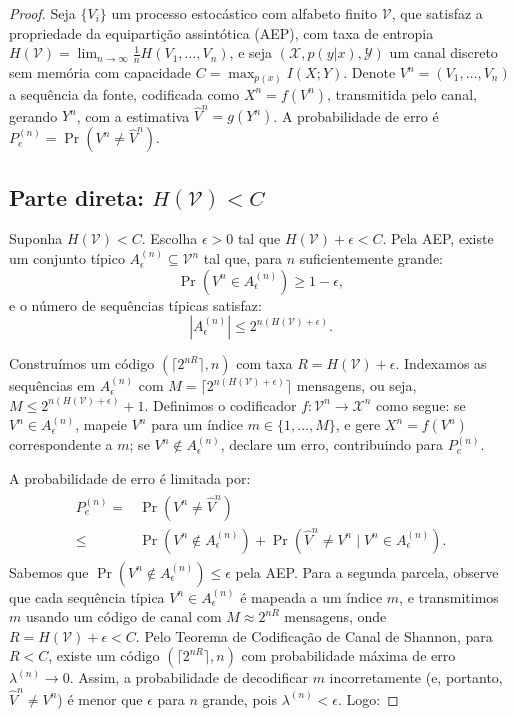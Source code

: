 \begin{proof}
Seja $\{V_i\}$ um processo estocástico com alfabeto finito $\mathcal{V}$, que
satisfaz a propriedade da equipartição assintótica (AEP), com taxa de entropia
$H(\mathcal{V}) = \lim_{n \to \infty} \frac{1}{n} H(V_1, \ldots, V_n)$, e seja
$(\mathcal{X}, p(y|x), \mathcal{Y})$ um canal discreto sem memória com capacidade 
$C = \max_{p(x)} I(X; Y)$. Denote $V^n = (V_1, \ldots, V_n)$ a sequência da fonte, codificada
como $X^n = f(V^n)$, transmitida pelo canal, gerando $Y^n$, com a estimativa
$\hat{V}^n = g(Y^n)$. A probabilidade de erro é $P_e^{(n)} = \Pr(V^n \neq
\hat{V}^n)$.

\subsection*{Parte direta: $H(\mathcal{V}) < C$}
Suponha $H(\mathcal{V}) < C$. Escolha $\epsilon > 0$ tal que $H(\mathcal{V}) +
\epsilon < C$. Pela AEP, existe um conjunto típico $A_{\epsilon}^{(n)}
\subseteq \mathcal{V}^n$ tal que, para $n$ suficientemente grande:
\begin{equation}
\Pr(V^n \in A_{\epsilon}^{(n)}) \geq 1 - \epsilon,
\end{equation}
e o número de sequências típicas satisfaz:
\begin{equation}
|A_{\epsilon}^{(n)}| \leq 2^{n(H(\mathcal{V}) + \epsilon)}.
\end{equation}

Construímos um código $(\lceil 2^{nR} \rceil, n)$ com taxa 
$R = H(\mathcal{V}) + \epsilon$. Indexamos as sequências em 
$A_{\epsilon}^{(n)}$ com $M = \lceil 2^{n(H(\mathcal{V}) + \epsilon)} \rceil$ mensagens,
ou seja, $M \leq 2^{n(H(\mathcal{V}) + \epsilon)} + 1$. 
Definimos o codificador $f: \mathcal{V}^n \to \mathcal{X}^n$ como segue: 
se $V^n \in A_{\epsilon}^{(n)}$, mapeie $V^n$ para um índice $m \in \{1, \ldots, M\}$, e gere $X^n = f(V^n)$ correspondente a $m$;
se $V^n \notin A_{\epsilon}^{(n)}$, declare um erro, contribuindo para $P_e^{(n)}$.

A probabilidade de erro é limitada por:
\begin{align}
  \begin{split}P_e^{(n)} ={}& \Pr(V^n \neq \hat{V}^n) \\
        \leq{}& \Pr(V^n \notin A_{\epsilon}^{(n)}) + \Pr(\hat{V}^n \neq V^n \mid V^n \in A_{\epsilon}^{(n)}).\end{split}
\end{align}
Sabemos que $\Pr(V^n \notin A_{\epsilon}^{(n)}) \leq \epsilon$ pela AEP. Para a
segunda parcela, observe que cada sequência típica $V^n \in A_{\epsilon}^{(n)}$
é mapeada a um índice $m$, e transmitimos $m$ usando um código de canal com 
$M \approx 2^{nR}$ mensagens, onde $R = H(\mathcal{V}) + \epsilon < C$. Pelo
Teorema de Codificação de Canal de Shannon, para $R < C$, existe um código
$(\lceil 2^{nR} \rceil, n)$ com probabilidade máxima de erro $\lambda^{(n)} \to 0$.
Assim, a probabilidade de decodificar $m$ incorretamente (e, portanto,
$\hat{V}^n \neq V^n$) é menor que $\epsilon$ para $n$ grande, pois
$\lambda^{(n)} < \epsilon$. Logo:


\end{proof}
